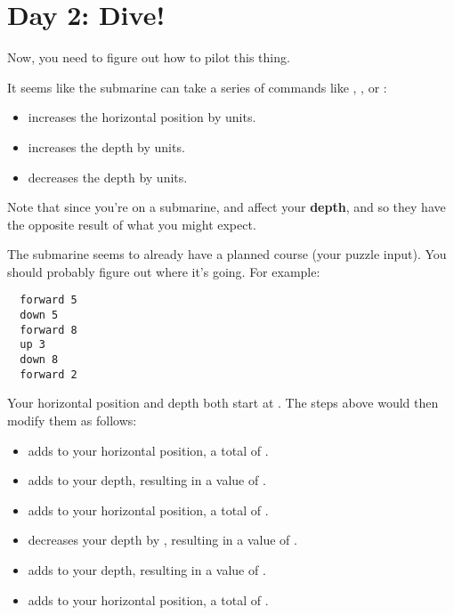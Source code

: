 \newpage%
\chapter{Day 2: Dive!}

Now, you need to figure out how to pilot this thing.

It seems like the submarine can take a series of commands like {\Tt{}\nwendquote}, {\Tt{}\nwendquote}, or {\Tt{}\nwendquote}:
\begin{itemize}
\item {\Tt{}\nwendquote} increases the horizontal position by  units.
\item {\Tt{}\nwendquote} increases the depth by  units.
\item {\Tt{}\nwendquote} decreases the depth by  units.
\end{itemize}

Note that since you're on a submarine, {\Tt{}\nwendquote} and {\Tt{}\nwendquote} affect your \textbf{depth}, and so they have the opposite result of what you might expect.

The submarine seems to already have a planned course (your puzzle input). You should probably figure out where it's going. For example:
\begin{verbatim}
  forward 5
  down 5
  forward 8
  up 3
  down 8
  forward 2
\end{verbatim}

Your horizontal position and depth both start at . The steps above would then modify them as follows:
\begin{itemize}
  \item {\Tt{}\nwendquote} adds  to your horizontal position, a total of .
  \item {\Tt{}\nwendquote} adds  to your depth, resulting in a value of .
  \item {\Tt{}\nwendquote} adds  to your horizontal position, a total of .
  \item {\Tt{}\nwendquote} decreases your depth by , resulting in a value of .
  \item {\Tt{}\nwendquote} adds  to your depth, resulting in a value of .
  \item {\Tt{}\nwendquote} adds  to your horizontal position, a total of .
\end{itemize}


